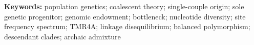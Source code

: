 \documentclass[11pt,a4paper]{article}
\begin{document}
\vspace{4pt}
\noindent\textbf{Keywords:} population genetics; coalescent theory;
single-couple origin; sole genetic progenitor; genomic endowment;
bottleneck; nucleotide diversity; site frequency spectrum; TMR4A;
linkage disequilibrium; balanced polymorphism; descendant clades;
archaic admixture

\vspace{8pt}







\end{document}
